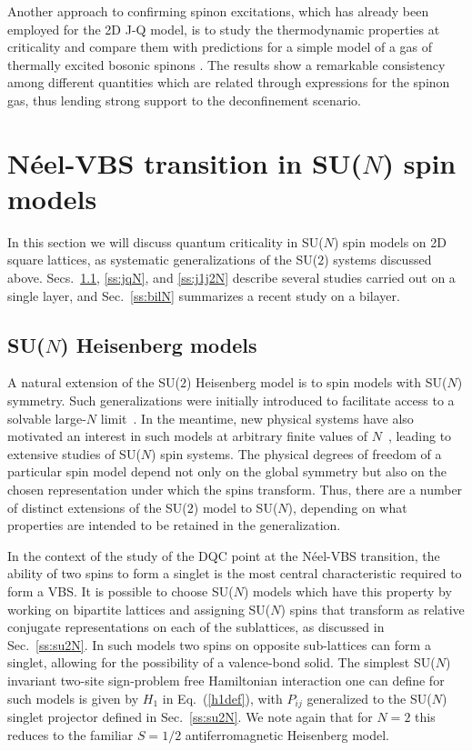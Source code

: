 \documentclass[range]{ar2e}
\begin{document}
Another approach to confirming spinon excitations, which has already been employed for the 2D J-Q model, is to study the thermodynamic properties at 
criticality and compare them with predictions for a simple model of a gas of thermally excited bosonic spinons \cite{Sandvik11a}. The results show a remarkable 
consistency among different quantities which are related through expressions for the spinon gas, thus lending strong support to the deconfinement scenario.

\section{N\'eel-VBS transition in SU($N$) spin models}
\label{sec:sunmodels}

In this section we will discuss quantum criticality in SU($N$) spin models on 2D square lattices, as systematic generalizations of the SU($2$) systems 
discussed above. Secs.~\ref{ss:j1N}, \ref{ss:jqN}, and \ref{ss:j1j2N} describe several studies carried out on a single layer, and Sec.~\ref{ss:bilN} summarizes 
a recent study on a bilayer. 

\subsection{SU($N$) Heisenberg models}
\label{ss:j1N}
A natural extension of the SU($2$) Heisenberg model is to spin models with SU($N$) symmetry. Such generalizations were initially introduced to
facilitate access to a solvable large-$N$ limit~\cite{affleck1985:lgN,Read89}. In the meantime, new physical systems have also motivated an interest 
in such models at arbitrary finite values of $N$~\cite{gorshkov2010:sun,kugel1982:kk}, leading to extensive studies of SU($N$) spin systems. The 
physical degrees of freedom of a particular spin model depend not only on the global symmetry but also on the chosen representation under which the 
spins transform. Thus, there are a number of distinct extensions of the SU($2$) model to SU($N$), depending on what properties are intended to be retained 
in the generalization. 

In the context of the study of the DQC point at the N\'eel-VBS transition, the ability of two spins to form a singlet is the most
central characteristic required to form a VBS. It is possible to choose SU($N$) models which have this property by working on bipartite lattices and
assigning SU($N$) spins that transform as relative conjugate representations on each of the sublattices, as discussed in Sec.~\ref{ss:su2N}. In such 
models two spins on opposite sub-lattices can form a singlet, allowing for the possibility of a valence-bond solid.  The simplest 
SU($N$) invariant two-site sign-problem free Hamiltonian interaction one can define for such models is given by $H_1$ in Eq.~(\ref{h1def}), with $P_{ij}$ 
generalized to the SU($N$) singlet projector defined in Sec.~\ref{ss:su2N}. We note again that for $N=2$ this reduces to the familiar $S=1/2$ 
antiferromagnetic Heisenberg model. 
\end{document}
